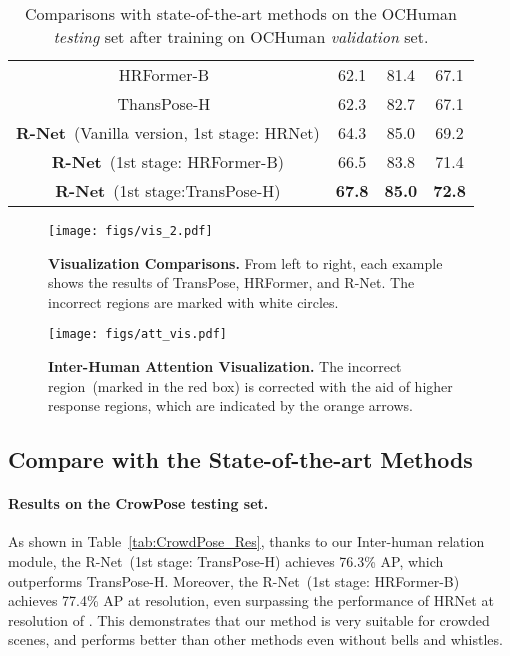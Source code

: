 \documentclass{article}
\begin{document}
\begin{table}[htp]
{\begin{tabular}{cccc}
\multicolumn{1}{c|}{HRFormer-B~\cite{YuanFHLZCW21}}                 & 62.1          & 81.4          & 67.1          \\
\multicolumn{1}{c|}{ThansPose-H~\cite{yang2021transpose}}         & 62.3          & 82.7          & 67.1          \\ \hline
\multicolumn{1}{c|}{\textbf{R-Net}~(Vanilla version, 1st stage: HRNet)}        & 64.3          & 85.0          & 69.2    \\
\multicolumn{1}{c|}{\textbf{R-Net}~(1st stage: HRFormer-B)}   & 66.5          & 83.8          & 71.4         \\
\multicolumn{1}{c|}{\textbf{R-Net}~(1st stage:TransPose-H)} & \textbf{67.8} & \textbf{85.0} & \textbf{72.8} \\ 
\bottomrule
\end{tabular}
}
\caption{\label{tab:OCHuman_Res}Comparisons with state-of-the-art methods on the OCHuman \emph{testing} set after training on OCHuman \emph{validation} set.}

\end{table}


\begin{figure*}[ht!]
 \centering
    \texttt{[image: figs/vis\_2.pdf]}
  \caption{\textbf{Visualization Comparisons.} From left to right, each example shows the results of TransPose, HRFormer, and R-Net. The incorrect regions are marked with white circles.\label{vis_res}}
\end{figure*}


\begin{figure}[t]
 \centering
    \texttt{[image: figs/att\_vis.pdf]}
  \caption{\textbf{Inter-Human Attention Visualization.} The incorrect region~(marked in the red box) is corrected with the aid of higher response regions, which are indicated by the orange arrows.\label{att_vis}}
\end{figure}


\subsection{Compare with the State-of-the-art Methods}



\paragraph{Results on the CrowPose testing set.}
As shown in Table~\ref{tab:CrowdPose_Res}, thanks to our Inter-human relation module, the R-Net~(1st stage: TransPose-H) achieves 76.3\% AP, which outperforms TransPose-H. Moreover, the R-Net~(1st stage: HRFormer-B) achieves 77.4\% AP at  resolution, even surpassing the performance of HRNet at resolution of . This demonstrates that our method is very suitable for crowded scenes, and performs better than other methods even without bells and whistles.
\end{document}

